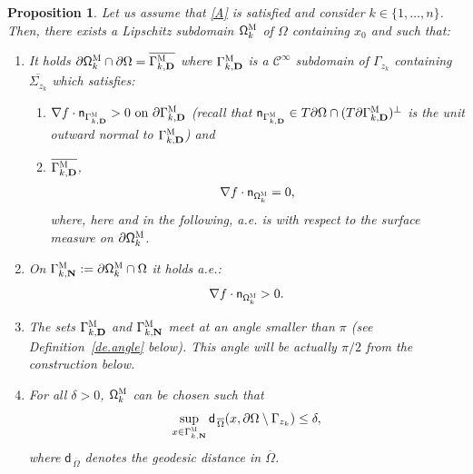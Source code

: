 \documentclass[10pt]{amsart}
\newcommand{\mbf}[1]{\mathbf{#1}}
\let\pa\partial
\theoremstyle{plain}
\newtheorem{proposition}{Proposition}
\theoremstyle{definition}
\begin{document}
\begin{proposition}\label{pr.omegakpoint}
Let us assume that \ref{A} is satisfied and
consider $k\in \{1,\ldots,n\}$. Then, there exists a Lipschitz
subdomain $\mathsf \Omega_k^{\textsc{M}}$ of $\Omega$ containing
$x_0$ and such that:
\begin{enumerate}
\item\label{pr.omegakpoint1}
It holds $\pa \mathsf \Omega_k^{\textsc{M}} \cap \partial \Omega = \overline{\Gamma_{k,\mbf D}^{\textsc{M}}}$ where $\Gamma_{k,\mbf D}^{\textsc{M}}$ is a $\mathcal C^\infty$ subdomain of $\Gamma_{z_k}$ containing $\overline{\Sigma_{z_k}}$ which satisfies:
\begin{enumerate}
\item\label{pr.omegakpoint1a}
$\nabla f\cdot \mathsf n_{ \Gamma_{k,\mbf D}^{\textsc{M}} }>0 \text{ on } \pa \Gamma_{k,\mbf D}^{\textsc{M}}$ (recall that $ \mathsf n_{ \Gamma_{k,\mbf D}^{\textsc{M}} }\in T\partial \Omega\cap (T\pa \Gamma_{k,\mbf D}^{\textsc{M}})^\bot$ is the unit outward normal to $ \Gamma_{k,\mbf D}^{\textsc{M}}$) and
\item\label{pr.omegakpoint1b}
 $\overline{ \Gamma_{k,\mbf D}^{\textsc{M}}}$,
\[
\nabla f\cdot \mathsf n_{ \mathsf \Omega_k^{\textsc{M}}}=0,
\]
where, here and in the following, a.e. is with respect to the surface measure on $\pa \mathsf \Omega_k^{\textsc{M}}$.
\end{enumerate}

\item\label{pr.omegakpoint2}
On $\Gamma_{k,\mbf N}^{\textsc{M}}:=\pa \mathsf \Omega_k^{\textsc{M}} \cap \Omega$ it holds a.e.:
\[
\nabla f \cdot \mathsf n_{\mathsf \Omega_k^{\textsc{M}}} >0.
\]

\item\label{pr.omegakpoint3}
The sets $\Gamma_{k,\mbf D}^{\textsc{M}}$ and $\Gamma_{k,\mbf N}^{\textsc{M}}$ meet at an angle smaller than
$\pi$ (see Definition~\ref{de.angle} below). This angle will be actually $\pi/2$ from the construction below.

\item\label{pr.omegakpoint4}
For all $\delta>0$, $\mathsf \Omega_k^{\textsc{M}}$ can be chosen such that
\begin{equation}\label{eq.gamma2_close_to_Bzc}
\sup_{x\in \Gamma_{k,\mbf N}^{\textsc{M}}}\mathsf d_{\, \overline \Omega}(x, \partial \Omega \setminus \Gamma_{z_k})\le\delta,
\end{equation}
where $\mathsf d_{\, \overline \Omega}$ denotes the geodesic distance in $\overline \Omega$.
\end{enumerate}
\end{proposition}
\end{document}
